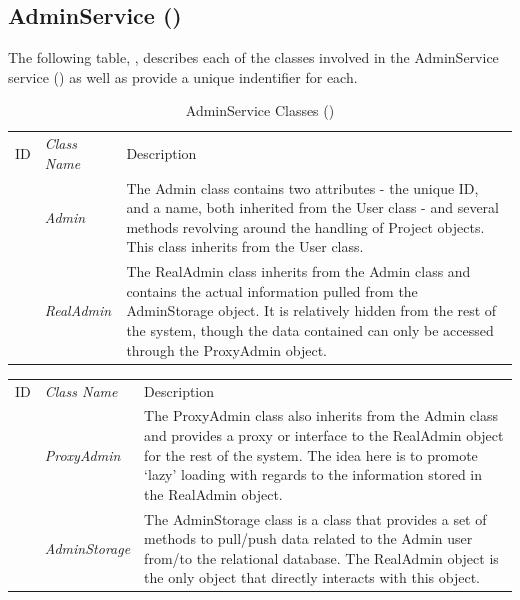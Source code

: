 \documentclass[12pt,letterpaper]{article}
\begin{document}
\subsection{AdminService ()}

The following table, , describes each of the classes involved in the AdminService service () as well as provide a unique indentifier for each.

\begin{table}[H]
	\caption{AdminService Classes ()} 
	\begin{tabu} to 
	    \tableheader{}ID & Class Name & Description \\
		 & Admin & The Admin class contains two attributes - the unique ID, and a name, both inherited from the User class - and several methods revolving around the handling of Project objects. This class inherits from the User class. \\
		 & RealAdmin & The RealAdmin class inherits from the Admin class and contains the actual information pulled from the AdminStorage object. It is relatively hidden from the rest of the system, though the data contained can only be accessed through the ProxyAdmin object. \\
	\end{tabu}
\end{table}

\begin{center}
	\begin{tabu} to 
	    \tableheader{}ID & Class Name & Description \\
	 & ProxyAdmin & The ProxyAdmin class also inherits from the Admin class and provides a proxy or interface to the RealAdmin object for the rest of the system. The idea here is to promote `lazy' loading with regards to the information stored in the RealAdmin object.\\
	 & AdminStorage & The AdminStorage class is a class that provides a set of methods to pull/push data related to the Admin user from/to the relational database. The RealAdmin object is the only object that directly interacts with this object.\\
	\end{tabu}
\end{center}
\end{document}
